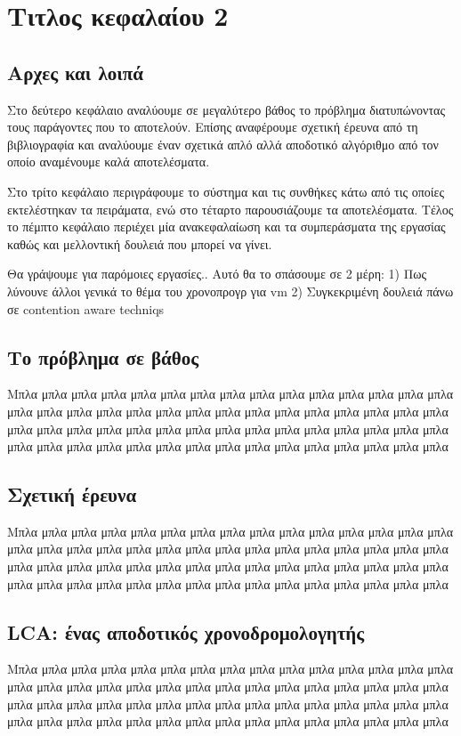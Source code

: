 \chapter{Τιτλος κεφαλαίου 2}
\section{Αρχες και λοιπά}
Στο δεύτερο κεφάλαιο αναλύουμε σε μεγαλύτερο βάθος το πρόβλημα διατυπώνοντας
τους παράγοντες που το αποτελούν. Επίσης αναφέρουμε σχετική έρευνα από τη
βιβλιογραφία και αναλύουμε έναν σχετικά απλό αλλά αποδοτικό αλγόριθμο από τον
οποίο αναμένουμε καλά αποτελέσματα.

Στο τρίτο κεφάλαιο περιγράφουμε το σύστημα και τις συνθήκες κάτω από τις οποίες
εκτελέστηκαν τα πειράματα, ενώ στο τέταρτο παρουσιάζουμε τα αποτελέσματα. Τέλος
το πέμπτο κεφάλαιο περιέχει μία ανακεφαλαίωση και τα συμπεράσματα της εργασίας
καθώς και μελλοντική δουλειά που μπορεί να γίνει.

Θα γράψουμε για παρόμοιες εργασίες.. Αυτό θα το σπάσουμε σε 2 μέρη:
1) Πως λύνουνε άλλοι γενικά το θέμα του χρονοπρογρ για vm
2) Συγκεκριμένη δουλειά πάνω σε contention aware techniqs
\section{Το πρόβλημα σε βάθος}
Μπλα μπλα μπλα μπλα μπλα μπλα μπλα μπλα μπλα μπλα μπλα μπλα μπλα μπλα μπλα 
μπλα μπλα μπλα μπλα μπλα μπλα μπλα μπλα μπλα μπλα μπλα μπλα μπλα μπλα μπλα 
μπλα μπλα μπλα μπλα μπλα μπλα μπλα μπλα μπλα μπλα μπλα μπλα μπλα μπλα μπλα 
μπλα μπλα μπλα μπλα μπλα μπλα μπλα μπλα μπλα μπλα μπλα μπλα μπλα μπλα μπλα 
\section{Σχετική έρευνα}
Μπλα μπλα μπλα μπλα μπλα μπλα μπλα μπλα μπλα μπλα μπλα μπλα μπλα μπλα μπλα 
μπλα μπλα μπλα μπλα μπλα μπλα μπλα μπλα μπλα μπλα μπλα μπλα μπλα μπλα μπλα 
μπλα μπλα μπλα μπλα μπλα μπλα μπλα μπλα μπλα μπλα μπλα μπλα μπλα μπλα μπλα 
μπλα μπλα μπλα μπλα μπλα μπλα μπλα μπλα μπλα μπλα μπλα μπλα μπλα μπλα μπλα 
\section{LCA: ένας αποδοτικός χρονοδρομολογητής}
Μπλα μπλα μπλα μπλα μπλα μπλα μπλα μπλα μπλα μπλα μπλα μπλα μπλα μπλα μπλα 
μπλα μπλα μπλα μπλα μπλα μπλα μπλα μπλα μπλα μπλα μπλα μπλα μπλα μπλα μπλα 
μπλα μπλα μπλα μπλα μπλα μπλα μπλα μπλα μπλα μπλα μπλα μπλα μπλα μπλα μπλα 
μπλα μπλα μπλα μπλα μπλα μπλα μπλα μπλα μπλα μπλα μπλα μπλα μπλα μπλα μπλα 
